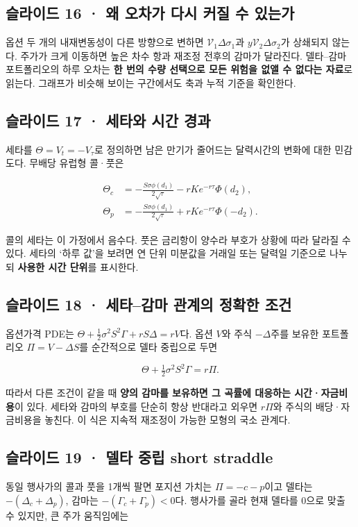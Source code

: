 \documentclass[11pt,a4paper]{article}
\begin{document}
\subsection{슬라이드 16 · 왜 오차가 다시 커질 수 있는가}
옵션 두 개의 내재변동성이 다른 방향으로 변하면 $\mathcal V_1\Delta\sigma_1$과 $y\mathcal V_2\Delta\sigma_2$가 상쇄되지 않는다. 주가가 크게 이동하면 높은 차수 항과 재조정 전후의 감마가 달라진다. 델타–감마 포트폴리오의 하루 오차는 \textbf{한 번의 수량 선택으로 모든 위험을 없앨 수 없다는 자료}로 읽는다. 그래프가 비슷해 보이는 구간에서도 축과 누적 기준을 확인한다.\par

\subsection{슬라이드 17 · 세타와 시간 경과}
세타를 $\Theta=V_t=-V_\tau$로 정의하면 남은 만기가 줄어드는 달력시간의 변화에 대한 민감도다. 무배당 유럽형 콜·풋은\par

\[
\begin{aligned}
\Theta_c&=-\frac{S\sigma\phi(d_1)}{2\sqrt\tau}
-rKe^{-r\tau}\Phi(d_2),\\
\Theta_p&=-\frac{S\sigma\phi(d_1)}{2\sqrt\tau}
+rKe^{-r\tau}\Phi(-d_2).
\end{aligned}
\]

콜의 세타는 이 가정에서 음수다. 풋은 금리항이 양수라 부호가 상황에 따라 달라질 수 있다. 세타의 ‘하루 값’을 보려면 연 단위 미분값을 거래일 또는 달력일 기준으로 나누되 \textbf{사용한 시간 단위}를 표시한다.\par

\subsection{슬라이드 18 · 세타–감마 관계의 정확한 조건}
옵션가격 PDE는 $\Theta+\frac12\sigma^2S^2\Gamma+rS\Delta=rV$다. 옵션 $V$와 주식 $-\Delta$주를 보유한 포트폴리오 $\Pi=V-\Delta S$를 순간적으로 델타 중립으로 두면\par

\[
\Theta+\tfrac12\sigma^2S^2\Gamma=r\Pi.
\]

따라서 다른 조건이 같을 때 \textbf{양의 감마를 보유하면 그 곡률에 대응하는 시간·자금비용}이 있다. 세타와 감마의 부호를 단순히 항상 반대라고 외우면 $r\Pi$와 주식의 배당·자금비용을 놓친다. 이 식은 지속적 재조정이 가능한 모형의 국소 관계다.\par

\subsection{슬라이드 19 · 델타 중립 short straddle}
동일 행사가의 콜과 풋을 1개씩 팔면 포지션 가치는 $\Pi=-c-p$이고 델타는 $-(\Delta_c+\Delta_p)$, 감마는 $-(\Gamma_c+\Gamma_p)<0$다. 행사가를 골라 현재 델타를 0으로 맞출 수 있지만, 큰 주가 움직임에는\par
\end{document}
